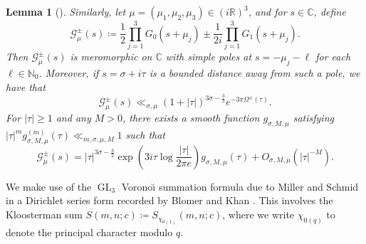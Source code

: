 \documentclass[11pt,a4paper]{amsart}
\newcommand{\C}{\mathbb{C}}
\newcommand{\Gscr}{\mathscr{G}}
\newcommand{\N}{\mathbb{N}}
\newcommand{\R}{\mathbb{R}}
\DeclareMathOperator{\GL}{GL}
\numberwithin{equation}{section}
\newtheorem{lemma}[equation]{Lemma}
\theoremstyle{remark}
\theoremstyle{definition}
\begin{document}
\begin{lemma}[{\cite[Section 2.2 and Lemma 4]{BK19}}]
Similarly, let $\mu = (\mu_1,\mu_2,\mu_3) \in (i\R)^3$, and for $s \in \C$, define
\begin{equation}
\label{eqn:Gscrmupm}
\Gscr_{\mu}^{\pm}(s) \coloneqq \frac{1}{2} \prod_{j = 1}^{3} G_0(s + \mu_j) \pm \frac{1}{2i} \prod_{j = 1}^{3} G_1(s + \mu_j).
\end{equation}
Then $\Gscr_{\mu}^{\pm}(s)$ is meromorphic on $\C$ with simple poles at $s = -\mu_j - \ell$ for each $\ell \in \N_0$. Moreover, if $s = \sigma + i\tau$ is a bounded distance away from such a pole, we have that
\begin{equation}
\label{eqn:Gscrmubounds}
\Gscr_{\mu}^{\pm}(s) \ll_{\sigma,\mu} (1 + |\tau|)^{3\sigma - \frac{3}{2}} e^{-3\pi \Omega^{\pm}(\tau)}.
\end{equation}
For $|\tau| \geq 1$ and any $M > 0$, there exists a smooth function $g_{\sigma,M,\mu}$ satisfying $|\tau|^m g_{\sigma,M,\mu}^{(m)}(\tau) \ll_{m,\sigma,\mu,M} 1$ such that
\begin{equation}
\label{eqn:Gscrpmasymp}
\Gscr_{\mu}^{\pm}(s) = |\tau|^{3\sigma - \frac{3}{2}} \exp\left(3i\tau \log \frac{|\tau|}{2\pi e}\right) g_{\sigma,M,\mu}(\tau) + O_{\sigma,M,\mu}(|\tau|^{-M}).
\end{equation}
\end{lemma}

We make use of the $\GL_3$ Vorono\u{\i} summation formula due to Miller and Schmid \cite{MS06} in a Dirichlet series form recorded by Blomer and Khan \cite{BK19}. This involves the Kloosterman sum $S(m,n;c) \coloneqq S_{\chi_{0(1)}}(m,n;c)$, where we write $\chi_{0(q)}$ to denote the principal character modulo $q$.
\end{document}
